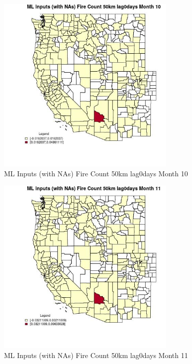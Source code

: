 \begin{figure} 
\centering  
\includegraphics[width=0.77\textwidth]{Code_Outputs/Report_ML_input_PM25_Step4_part_e_de_duplicated_aves_compiled_2019-05-21wNAs_CountyFire_Count_50km_lag0daysmedianMonth10.jpg} 
\caption{\label{fig:Report_ML_input_PM25_Step4_part_e_de_duplicated_aves_compiled_2019-05-21wNAsCountyFire_Count_50km_lag0daysmedianMonth10}ML Inputs (with NAs) Fire Count 50km lag0days Month 10} 
\end{figure} 
 

\begin{figure} 
\centering  
\includegraphics[width=0.77\textwidth]{Code_Outputs/Report_ML_input_PM25_Step4_part_e_de_duplicated_aves_compiled_2019-05-21wNAs_CountyFire_Count_50km_lag0daysmedianMonth11.jpg} 
\caption{\label{fig:Report_ML_input_PM25_Step4_part_e_de_duplicated_aves_compiled_2019-05-21wNAsCountyFire_Count_50km_lag0daysmedianMonth11}ML Inputs (with NAs) Fire Count 50km lag0days Month 11} 
\end{figure} 
 


